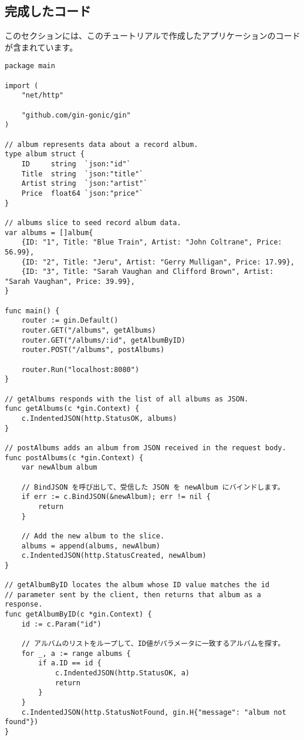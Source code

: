 
\subsection{完成したコード}

このセクションには、このチュートリアルで作成したアプリケーションのコードが含まれています。

\begin{lstlisting}[numbers=none]
package main

import (
    "net/http"

    "github.com/gin-gonic/gin"
)

// album represents data about a record album.
type album struct {
    ID     string  `json:"id"`
    Title  string  `json:"title"`
    Artist string  `json:"artist"`
    Price  float64 `json:"price"`
}

// albums slice to seed record album data.
var albums = []album{
    {ID: "1", Title: "Blue Train", Artist: "John Coltrane", Price: 56.99},
    {ID: "2", Title: "Jeru", Artist: "Gerry Mulligan", Price: 17.99},
    {ID: "3", Title: "Sarah Vaughan and Clifford Brown", Artist: "Sarah Vaughan", Price: 39.99},
}

func main() {
    router := gin.Default()
    router.GET("/albums", getAlbums)
    router.GET("/albums/:id", getAlbumByID)
    router.POST("/albums", postAlbums)

    router.Run("localhost:8080")
}

// getAlbums responds with the list of all albums as JSON.
func getAlbums(c *gin.Context) {
    c.IndentedJSON(http.StatusOK, albums)
}

// postAlbums adds an album from JSON received in the request body.
func postAlbums(c *gin.Context) {
    var newAlbum album

    // BindJSON を呼び出して、受信した JSON を newAlbum にバインドします。
    if err := c.BindJSON(&newAlbum); err != nil {
        return
    }

    // Add the new album to the slice.
    albums = append(albums, newAlbum)
    c.IndentedJSON(http.StatusCreated, newAlbum)
}

// getAlbumByID locates the album whose ID value matches the id
// parameter sent by the client, then returns that album as a response.
func getAlbumByID(c *gin.Context) {
    id := c.Param("id")

    // アルバムのリストをループして、ID値がパラメータに一致するアルバムを探す。
    for _, a := range albums {
        if a.ID == id {
            c.IndentedJSON(http.StatusOK, a)
            return
        }
    }
    c.IndentedJSON(http.StatusNotFound, gin.H{"message": "album not found"})
}
\end{lstlisting}
